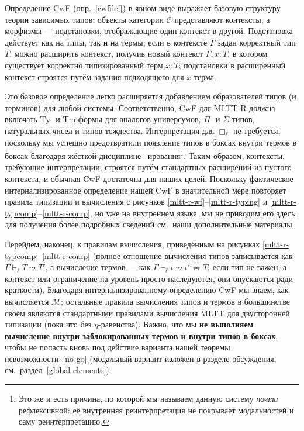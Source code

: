 Определение CwF (опр.~\ref{cwfdef}) в явном виде
выражает базовую структуру теории зависимых типов:
объекты категории $\mathcal{C}$ представляют контексты,
а морфизмы — подстановки, отображающие один контекст в
другой. Подстановка действует как на типы, так и на
термы; если в контексте $\Gamma$ задан корректный тип
$T$, можно расширить контекст, получив новый контекст
$\Gamma, x{:}T$, в котором существует корректно
типизированный терм $x{:}T$; подстановки в расширенный
контекст строятся путём задания подходящего для $x$
терма.

Это базовое определение легко расширяется добавлением
образователей типов (и терминов) для любой системы.
Соответственно, CwF для MLTT-R должна включать
$\mathrm{Ty}$- и $\mathrm{Tm}$-формы для аналогов
универсумов, $\Pi$- и $\Sigma$-типов, натуральных чисел
и типов тождества. Интерпретация для $\Box_\ell$ не
требуется, поскольку мы успешно предотвратили появление
типов в боксах внутри термов в боксах благодаря жёсткой
дисциплине~\faLock-ирования\footnote{Это же и есть
причина, по которой мы называем данную систему
\emph{почти} рефлексивной: её внутренняя
реинтерпретация не покрывает модальностей и саму
реинтерпретацию.}. Таким образом, контексты, требующие
интерпретации, строятся путём стандартных расширений из
пустого контекста, и обычная CwF достаточна для наших
целей. Поскольку фактическое интернализированное
определение нашей CwF в значительной мере повторяет
правила типизации и вычисления с рисунков
\ref{mltt-r-wf}--\ref{mltt-r-typing} и
\ref{mltt-r-typcomp}--\ref{mltt-r-comp}, но уже на
внутреннем языке, мы не приводим его здесь; для
получения более подробных сведений см.\ наши
дополнительные материалы.

Перейдём, наконец, к правилам вычисления, приведённым
на рисунках \ref{mltt-r-typcomp}--\ref{mltt-r-comp}
(полное отношение вычисления типов записывается как
$\Gamma\vdash_\ell T\leadsto T'$, а вычисление термов —
как $\Gamma\vdash_\ell t\leadsto t' \Leftrightarrow T$;
если тип не важен, а контекст или ограничение на
уровень просто наследуются, они опускаются ради
краткости). Благодаря интернализированному определению
CwF мы знаем, как вычисляется $\mathcal{M}$; остальные
правила вычисления типов и термов в большинстве своём
являются стандартными правилами вычисления MLTT для
двусторонней типизации (пока что без $\eta$-равенства).
Важно, что мы \textbf{не выполняем вычисление внутри
заблокированных термов и внутри типов в боксах}, чтобы
не попасть вновь под действие варианта нашей теоремы
невозможности~\ref{no-go} (модальный вариант изложен в
разделе обсуждения, см.\ раздел~\ref{global-elements}).

